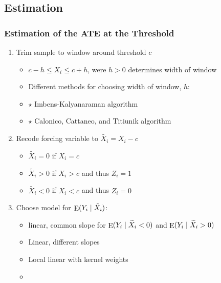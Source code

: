 \documentclass[table, xcolor = {dvipsnames}, 9pt]{beamer}
\theoremstyle{plain}
\newcommand{\mh}[1]{{\color{magenta}{#1}}}
\DeclareMathOperator{\E}{\rm{E}}
\begin{document}
\subsection{Estimation}
\begin{frame}
\frametitle{Estimation of the ATE at the Threshold}
\vfill
\begin{enumerate} \vfill
\item Trim sample to window around threshold $c$ \vfill
\begin{itemize} \vfill
\item $c-h\leq X_i \leq c + h$, were $h > 0 $ determines width of window \vfill
\item Different methods for choosing width of window, $h$: \vfill
\item[] $\star$ Imbens-Kalyanaraman algorithm \citep{imbenskalyanaraman2012} \vfill
\item[] $\star$ Calonico, Cattaneo, and Titiunik algorithm  \citep{calonicoetal2014} \vfill
\end{itemize} \vfill
\item Recode forcing variable to $\widetilde{X_i} = X_i - c$ \vfill
\begin{itemize} \vfill
\item $\widetilde{X_i} = 0$ if $X_i=c$ \vfill
\item $\widetilde{X_i} > 0$ if $X_i>c$ and thus $Z_i=1$ \vfill
\item $\widetilde{X_i} < 0$ if $X_i<c$ and thus $Z_i=0$ \vfill
\end{itemize} \vfill
\item Choose model for $\E(Y_i \mid \tilde X_i)$: \vfill
\begin{itemize} \vfill
\item linear, common slope for $\E(Y_i \mid \widetilde{X}_i< 0)$ and $\E(Y_i \mid \widetilde{X}_i > 0)$ \vfill
\item Linear, different slopes \vfill
\item Local linear with kernel weights \vfill
\item[] \mh{Each model invokes particular modeling assumptions} \vfill
\end{itemize} \vfill
\end{enumerate} \vfill
\end{frame}
\end{document}
